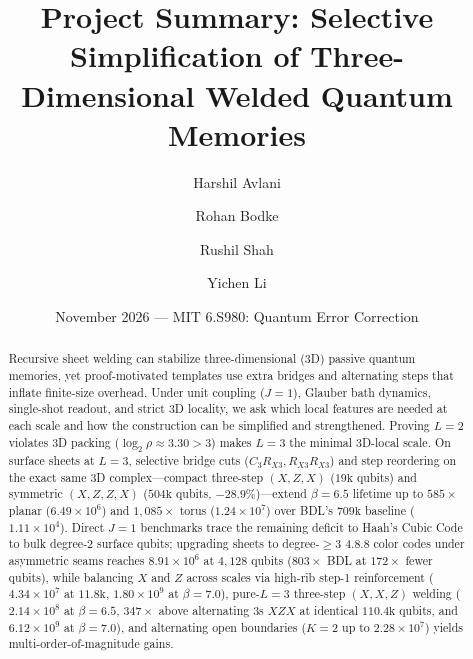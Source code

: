 \documentclass[aps,prx,reprint,superscriptaddress,nofootinbib,floatfix]{revtex4-2}
\begin{document}
\title{Project Summary: Selective Simplification of Three-Dimensional Welded Quantum Memories}

\author{Harshil Avlani}
\author{Rohan Bodke}
\author{Rushil Shah}
\author{Yichen Li}

\date{November 2026 --- MIT 6.S980: Quantum Error Correction}

\begin{abstract}
Recursive sheet welding can stabilize three-dimensional (3D) passive quantum memories, yet proof-motivated templates use extra bridges and alternating steps that inflate finite-size overhead. Under unit coupling ($J = 1$), Glauber bath dynamics, single-shot readout, and strict 3D locality, we ask which local features are needed at each scale and how the construction can be simplified and strengthened. Proving $L = 2$ violates 3D packing ($\log_2 \rho \approx 3.30 > 3$) makes $L = 3$ the minimal 3D-local scale. On surface sheets at $L = 3$, selective bridge cuts ($C_3 R_{X3}, R_{X3} R_{X3}$) and step reordering on the exact same 3D complex---compact three-step $(X, Z, X)$ ($19\mathrm{k}$ qubits) and symmetric $(X, Z, Z, X)$ ($504\mathrm{k}$ qubits, $-28.9\%$)---extend $\beta = 6.5$ lifetime up to $585\times$ planar ($6.49 \times 10^6$) and $1{,}085\times$ torus ($1.24 \times 10^7$) over BDL's $709\mathrm{k}$ baseline ($1.11 \times 10^4$). Direct $J = 1$ benchmarks trace the remaining deficit to Haah's Cubic Code to bulk degree-$2$ surface qubits; upgrading sheets to degree-$\ge 3$ 4.8.8 color codes under asymmetric seams reaches $8.91 \times 10^6$ at $4{,}128$ qubits ($803\times$ BDL at $172\times$ fewer qubits), while balancing $X$ and $Z$ across scales via high-rib step-1 reinforcement ($4.34 \times 10^7$ at $11.8\mathrm{k}$, $1.80 \times 10^9$ at $\beta = 7.0$), pure-$L = 3$ three-step $(X, X, Z)$ welding ($2.14 \times 10^8$ at $\beta = 6.5$, $347\times$ above alternating 3s $XZX$ at identical $110.4\mathrm{k}$ qubits, and $6.12 \times 10^9$ at $\beta = 7.0$), and alternating open boundaries ($K = 2$ up to $2.28 \times 10^7$) yields multi-order-of-magnitude gains.
\end{abstract}
\end{document}
